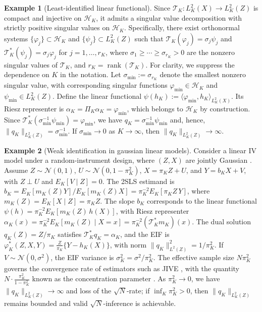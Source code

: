\documentclass[11pt]{article}
\theoremstyle{plain}
\theoremstyle{definition}
\newtheorem{example}{Example}
\theoremstyle{remark}
\theoremstyle{definition}
\begin{document}
\begin{example}[Least-identified linear functional]
Since \( \mathcal{T}_K : L^2_K(X) \to L^2_K(Z) \) is compact and injective on \( \mathcal{H}_K \), it admits a singular value decomposition with strictly positive singular values on \( \mathcal{H}_K \). Specifically, there exist orthonormal systems \( \{\varphi_j\} \subset \mathcal{H}_K \) and \( \{\psi_j\} \subset L^2_K(Z) \) such that \( \mathcal{T}_K(\varphi_j) = \sigma_j \psi_j \) and \( \mathcal{T}_K^*(\psi_j) = \sigma_j \varphi_j \) for \( j = 1, \dots, r_K \), where \( \sigma_1 \ge \cdots \ge \sigma_{r_K} > 0 \) are the nonzero singular values of \( \mathcal{T}_K \), and \( r_K = \operatorname{rank}(\mathcal{T}_K) \). For clarity, we suppress the dependence on \( K \) in the notation. Let \( \sigma_{\min} := \sigma_{r_K} \) denote the smallest nonzero singular value, with corresponding singular functions \( \varphi_{\min} \in \mathcal{H}_K \) and \( \psi_{\min} \in L^2_K(Z) \). Define the linear functional \( \psi(h_K) := \langle \varphi_{\min}, h_K \rangle_{L^2_K(X)} \). Its Riesz representer is \( \alpha_K = \Pi_K \alpha_K = \varphi_{\min} \), which belongs to \( \mathcal{H}_K \) by construction. Since \( \mathcal{T}_K^*(\sigma_{\min}^{-1} \psi_{\min}) = \varphi_{\min} \),  we have \( q_K = \sigma_{\min}^{-1} \psi_{\min} \) and, hence, \( \|q_K\|_{L^2_K(Z)} = \sigma_{\min}^{-1} \). If \( \sigma_{\min} \to 0 \) as \( K \to \infty \), then \( \|q_K\|_{L^2_K(Z)} \to \infty \).
\end{example}



\begin{example}[Weak identification in gaussian linear models]
Consider a linear IV model under a random-instrument design, where \((Z, X)\) are jointly Gaussian \citep{bound1995problems, han2006gmm, newey2009generalized}.  Assume \(Z \sim \mathcal{N}(0,1)\), \(U \sim \mathcal{N}(0, 1 - \pi_K^2)\), \(X = \pi_K Z + U\), and \(Y = b_K X + V\), with \(Z \perp U\) and \(E_K[V \mid Z] = 0\). The 2SLS estimand is \(b_K = E_K[m_K(Z) Y] / E_K[m_K(Z) X] = \pi_K^{-2} E_K[\pi_K Z\, Y]\), where \(m_K(Z) = E_K[X \mid Z] = \pi_K Z\). The slope $b_K$ corresponds to the linear functional \(\psi(h) = \pi_K^{-2} E_K[m_K(Z)\, h(X)]\), with Riesz representer \(\alpha_K(x) = \pi_K^{-2} E_K[m_K(Z) \mid X = x] = \pi_K^{-2} (\mathcal{T}_K^* m_K)(x)\). The dual solution \(q_K(Z) = Z / \pi_K\) satisfies \(\mathcal{T}_K^* q_K = \alpha_K\), and the EIF is \(\varphi_K^*(Z, X, Y) = \frac{Z}{\pi_K} \{Y - h_K(X)\}\), with norm \(\|q_K\|_{L^2(Z)}^2 = 1 / \pi_K^2\). If \(V \sim \mathcal{N}(0, \sigma^2)\), the EIF variance is \(\sigma_K^2 = \sigma^2 / \pi_K^2\). The effective sample size \(N \pi_K^2\) governs the convergence rate of estimators such as JIVE \citep{angrist1999jackknife}, with the quantity \(N \cdot \frac{\pi_K^2}{1 - \pi_K^2}\) known as the concentration parameter \citep{han2006gmm}. As \(\pi_K^2 \to 0\), we have \(\|q_K\|_{L^2_K(Z)} \to \infty\) and loss of the \(\sqrt{N}\)-rate; if \(\inf_K \pi_K^2 > 0\), then \(\|q_K\|_{L^2_K(Z)}\) remains bounded and valid \(\sqrt{N}\)-inference is achievable.
\end{example}
\end{document}

